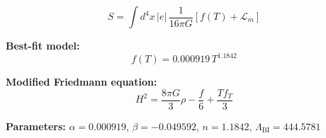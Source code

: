
\begin{equation}
  S = \int d^4x \, |e| \, \frac{1}{16\pi G} \left[ f(T) + \mathcal{L}_m \right]
\end{equation}

\textbf{Best-fit model:}
\begin{equation}
  f(T) = 0.000919 \, T^{1.1842}
\end{equation}

\textbf{Modified Friedmann equation:}
\begin{equation}
  H^2 = \frac{8\pi G}{3} \rho - \frac{f}{6} + \frac{T f_T}{3}
\end{equation}

\textbf{Parameters:}
$\alpha = 0.000919$, \quad
$\beta = -0.049592$, \quad
$n = 1.1842$, \quad
$\Lambda_{\text{BI}} = 444.5781$